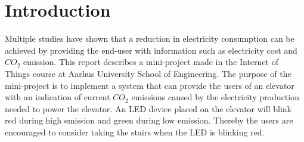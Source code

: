 \documentclass[Main]{subfiles}
\begin{document}
\section{Introduction} %
\label{sec:introduction}
Multiple studies have shown that a reduction in electricity consumption can be achieved by providing the end-user with information such as electricity cost and $CO_2$ emission\cite{tricascade}. 
This report describes a mini-project made in the Internet of Things course at Aarhus University School of Engineering. 
The purpose of the mini-project is to implement a system that can provide the users of an elevator with an indication of current $CO_2$ emissions caused by the electricity production needed to power the elevator. 
An LED device placed on the elevator will blink red during high emission and green during low emission. 
Thereby the users are encouraged to consider taking the stairs when the LED is blinking red. 






\end{document}
